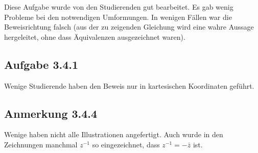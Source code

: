 \documentclass[a4paper]{article}
\begin{document}
Diese Aufgabe wurde von den Studierenden gut bearbeitet. Es gab wenig Probleme bei den notwendigen Umformungen. In wenigen Fällen war die Beweisrichtung falsch (aus der zu zeigenden Gleichung wird eine wahre Aussage hergeleitet, ohne dass Äquivalenzen ausgezeichnet waren).

\subsection{Aufgabe 3.4.1}

Wenige Studierende haben den Beweis nur in kartesischen Koordinaten geführt.

\subsection{Anmerkung 3.4.4}

Wenige haben nicht alle Illustrationen angefertigt. Auch wurde in den Zeichnungen manchmal $z^{-1}$ so eingezeichnet, dass $z^{-1} = -\bar z$ ist.
\end{document}
